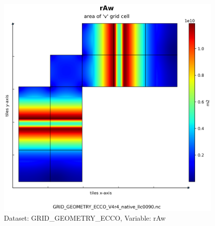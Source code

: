 \begin{figure}[H]
\centering
\includegraphics[scale=0.55]{../images/plots/native_plots_coords/Geometry_Parameters_for_the_Lat-Lon-Cap_90_(llc90)_Native_Model_Grid_(Version_4_Release_4)/rAw.png}
\caption{Dataset: GRID\_GEOMETRY\_ECCO, Variable: rAw}
\label{tab:table-GRID_GEOMETRY_ECCO_rAw-Plot}
\end{figure}
\pagebreak
